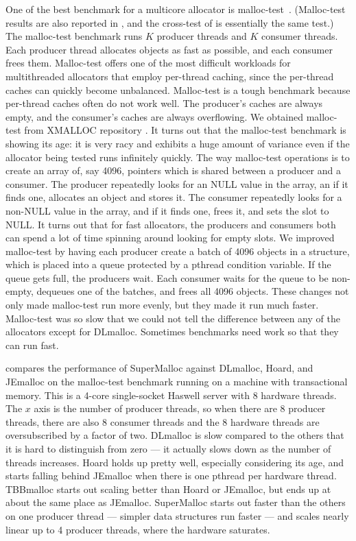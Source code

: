 \documentclass[pldi]{sigplanconf-pldi15}
\begin{document}
One of the best benchmark for a multicore allocator is
malloc-test~\cite{LeverBo00}.  (Malloc-test results are also reported
in \cite{Evans06}, and the cross-test of \cite{KukanovVo07} is
essentially the same test.)  The malloc-test benchmark runs $K$
producer threads and $K$ consumer threads.  Each producer thread
allocates objects as fast as possible, and each consumer frees them.
Malloc-test offers one of the most difficult workloads for
multithreaded allocators that employ per-thread caching, since the
per-thread caches can quickly become unbalanced.  Malloc-test is a
tough benchmark because per-thread caches often do not work well.  The
producer's caches are always empty, and the consumer's caches are
always overflowing.  We obtained malloc-test from XMALLOC repository
\cite{EderSc12}.  It turns out that the malloc-test benchmark is
showing its age: it is very racy and exhibits a huge amount of
variance even if the allocator being tested runs infinitely quickly.
The way malloc-test operations is to create an array of, say 4096,
pointers which is shared between a producer and a consumer.  The
producer repeatedly looks for an NULL value in the array, an if it
finds one, allocates an object and stores it.  The consumer repeatedly
looks for a non-NULL value in the array, and if it finds one, frees
it, and sets the slot to NULL\@.  It turns out that for fast
allocators, the producers and consumers both can spend a lot of time
spinning around looking for empty slots.  We improved malloc-test by
having each producer create a batch of 4096 objects in a structure,
which is placed into a queue protected by a pthread condition
variable.  If the queue gets full, the producers wait.  Each consumer
waits for the queue to be non-empty, dequeues one of the batches, and
frees all 4096 objects.  These changes not only made malloc-test run
more evenly, but they made it run much faster.  Malloc-test was so
slow that we could not tell the difference between any of the
allocators except for DLmalloc.  Sometimes benchmarks need work so
that they can run fast.

 compares the performance of SuperMalloc against
DLmalloc, Hoard, and JEmalloc on the malloc-test benchmark running on
a machine with transactional memory.  This is a 4-core single-socket
Haswell server with 8 hardware threads.  The $x$ axis is the number of
producer threads, so when there are $8$ producer threads, there are
also $8$ consumer threads and the 8 hardware threads are
oversubscribed by a factor of two.  DLmalloc is slow compared to the
others that it is hard to distinguish from zero --- it actually slows
down as the number of threads increases.  Hoard holds up pretty well,
especially considering its age, and starts falling behind JEmalloc
when there is one pthread per hardware thread.  TBBmalloc starts out
scaling better than Hoard or JEmalloc, but ends up at about the same
place as JEmalloc.  SuperMalloc starts out faster than the others on
one producer thread --- simpler data structures run faster --- and
scales nearly linear up to 4 producer threads, where the hardware
saturates. 
\end{document}
